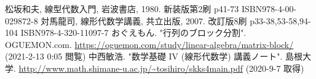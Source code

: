 \documentclass[dvipdfmx]{jsarticle}
\begin{document}
\begin{thebibliography}{50}
    松坂和夫, 線型代数入門, 岩波書店, 1980. 新装版第2刷 p41-73 ISBN978-4-00-029872-8
    対馬龍司, 線形代数学講義, 共立出版, 2007. 改訂版8刷 p33-38,53-58,94-104 ISBN978-4-320-11097-7
    おぐえもん. "行列のブロック分割". OGUEMON.com. \url{https://oguemon.com/study/linear-algebra/matrix-block/} (2021-2-13 0:05 閲覧)
    中西敏浩. "数学基礎 IV (線形代数学) 講義ノート". 島根大学. \url{http://www.math.shimane-u.ac.jp/~tosihiro/skks4main.pdf} (2020-9-7 取得)
\end{thebibliography}
\end{document}
